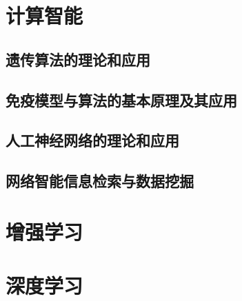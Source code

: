 \documentclass[UTF8]{../computerUniverse}
\begin{document}
\section{计算智能}

\subsection{遗传算法的理论和应用}
\subsection{免疫模型与算法的基本原理及其应用}
\subsection{人工神经网络的理论和应用}
\subsection{网络智能信息检索与数据挖掘}


\section{增强学习}
\section{深度学习}
\end{document}
